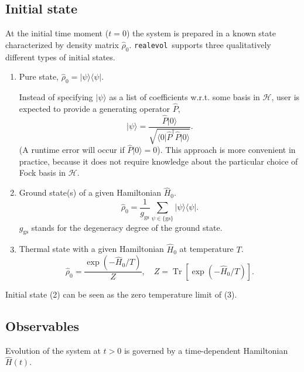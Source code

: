 \documentclass[]{article}
\DeclareMathOperator{\Tr}{Tr}
\newcommand{\realevol}{\texttt{realevol}}
\newcommand{\bra}[1]{\ensuremath{\langle#1|}}
\newcommand{\ket}[1]{\ensuremath{|#1\rangle}}
\begin{document}
\subsection{\label{sec:formulation:initial}Initial state}
At the initial time moment ($t=0$) the system is prepared in a known state characterized by density matrix $\hat\rho_0$. \realevol\ supports three
qualitatively different types of initial states.

\begin{enumerate}
    \item Pure state, $\hat\rho_0 = \ket{\psi}\bra{\psi}$.

    Instead of specifying $\ket{\psi}$ as a list of coefficients w.r.t. some basis in $\mathcal{H}$, user is expected to provide a generating operator $\hat P$,
    \begin{equation}
        \ket{\psi} = \frac{\hat P\ket{0}}
                    {\sqrt{\bra{0}\hat P^\dagger \hat P\ket{0}}}.
    \end{equation}
    (A runtime error will occur if $\hat P\ket{0} = 0$).
    This approach is more convenient in practice, because it does not require knowledge about the particular choice of Fock basis in $\mathcal{H}$.

    \item Ground state(s) of a given Hamiltonian $\hat H_0$.
    \begin{equation}
        \hat\rho_0 = \frac{1}{g_\mathrm{gs}}\sum_{\psi\in\{\mathrm{gs}\}} \ket{\psi}\bra{\psi}.
    \end{equation}
    $g_\mathrm{gs}$ stands for the degeneracy degree of the ground state.

    \item Thermal state with a given Hamiltonian $\hat H_0$ at temperature $T$.
    \begin{equation}
        \hat\rho_0 = \frac{\exp(-\hat H_0/T)}{Z},
        \quad Z = \Tr[\exp(-\hat H_0/T)].
    \end{equation}
\end{enumerate}

Initial state (2) can be seen as the zero temperature limit of (3).

\subsection{\label{sec:formulation:observables}Observables}

Evolution of the system at $t>0$ is governed by a time-dependent Hamiltonian $\hat H(t)$.
\end{document}
